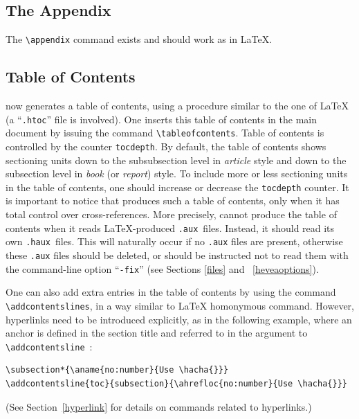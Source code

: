 \subsection{The Appendix}
The \verb+\appendix+ command exists and should work as in \LaTeX.

\subsection{Table of Contents}
%
%
\hevea{} now generates a table of contents, using a procedure similar
to the one of \LaTeX
(a ``\texttt{.htoc}'' file is involved).
One inserts this table of contents in the main document by issuing
the command \verb+\tableofcontents+.
Table of contents is controlled by the counter  \verb+tocdepth+.
By default, the table of contents shows sectioning units down to the
subsubsection level in \textit{article} style and down to the subsection level
in \textit{book} (or \textit{report}) style. To include more or less
sectioning units in the
table of contents, one should increase or decrease the \verb+tocdepth+
counter.
It is important to notice that \hevea{} produces such a table of
contents, only when it has total control over cross-references.
More precisely, \hevea{} cannot produce the table of contents when it
reads \LaTeX{}-produced \texttt{.aux}~files.
Instead, it should read its own \texttt{.haux}~files.
This will naturally occur if no \texttt{.aux} files are present,
otherwise these \texttt{.aux} files should be deleted, or \hevea{}
should be instructed not to read them with the command-line option
``\texttt{-fix}''
(see Sections \ref{files} and ~\ref{heveaoptions}).

One can also add extra entries in the table of contents by using
the command \verb+\addcontentslines+, in a way similar
to \LaTeX{} homonymous command.
However, hyperlinks need to be introduced explicitly,
as in the following example, where
an anchor is defined in the section title and referred to in the
argument to \verb+\addcontentsline+~:
\begin{verbatim}
\subsection*{\aname{no:number}{Use \hacha{}}}
\addcontentsline{toc}{subsection}{\ahrefloc{no:number}{Use \hacha{}}}
\end{verbatim}
(See Section~\ref{hyperlink} for details on commands related to hyperlinks.)

